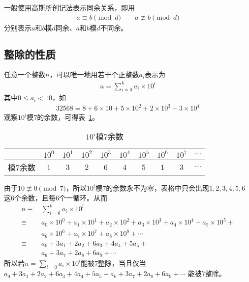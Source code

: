 一般使用高斯所创记法表示同余关系，即用
\begin{align*}
  a \equiv b \pmod d \quad\quad a\not\equiv b\pmod d
\end{align*}
分别表示$a$和$b$模$d$同余、$a$和$b$模$d$不同余。

\subsection{整除的性质}
\begin{example}[被$7$整除]\label{ex:divided-by-7}
  任意一个整数$n$，可以唯一地用若干个正整数$a_i$表示为
  \begin{align*}
    n=\sum_{i=0}^{k} a_i\times 10^i
  \end{align*}
  其中$0\le a_i<10$，如
  \begin{align*}
    32568 = 8 + 6\times 10 + 5\times 10^2 + 2\times 10^3 + 3\times10^4
  \end{align*}
  观察$10^i$模$7$的余数，可得表~\ref{tab:10^i-modular-7}。

  \begin{table}[htbp]
    \centering
    \begin{tabular}{cccccccccc}
      \toprule
                & $10^0$ & $10^1$ & $10^2$ & $10^3$ & $10^4$ & $10^5$ & $10^6$ & $10^7$ & $\cdots$ \\ \midrule
      模$7$余数 & $1$    & $3$    & $2$    & $6$    & $4$    & $5$    & $1$    & $3$    & $\cdots$ \\ 
      \bottomrule
    \end{tabular}
    \caption{$10^i$模$7$余数}
    \label{tab:10^i-modular-7}
  \end{table}

  由于$10\not\equiv0\pmod7$，所以$10^i$模$7$的余数永不为零，表格中只会出现$1,2,3,4,5,6$这$6$个余数，且每$6$个一循环。从而
  \begin{align*}
    n\equiv\,&\sum_{i=0}^{k} a_i\times10^i\tag*{$\pmod7$}\\
     \equiv\,& a_0\times10^0 + a_1\times10^1 + a_2\times10^2 + a_3\times10^3 + a_4\times10^4 + a_5\times10^5 +\\
             & a_6\times10^6 + a_7\times10^7 + a_8\times10^8 + \cdots \tag*{$\pmod7$}\\
     \equiv\,& a_0 + 3a_1 + 2a_2 + 6a_3 + 4a_4 + 5a_5 +\\
             & a_6 + 3a_7 + 2a_8 + 6a_9 + \cdots\tag*{$\pmod7$}
  \end{align*}
  所以若$n=\sum\limits_{i=0}a_i\times10^i$能被$7$整除，当且仅当
  $a_0 + 3a_1 + 2a_2 + 6a_3 + 4a_4 + 5a_5 + a_6 + 3a_7 + 2a_8 + 6a_9 + \cdots$
  能被$7$整除。
\end{example}

